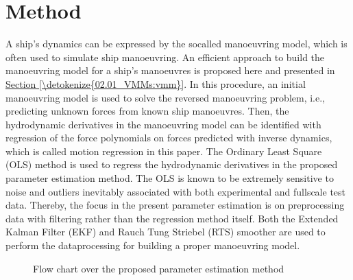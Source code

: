 \documentclass[review]{elsarticle}
\let\sphinxpxdimen\pdfpxdimen\else\newdimen\sphinxpxdimen
\begin{document}
\section{Method}
\label{\detokenize{01.01_method:method}}\label{\detokenize{01.01_method:id1}}\label{\detokenize{01.01_method::doc}}
\sphinxAtStartPar
A ship’s dynamics can be expressed by the so\sphinxhyphen{}called manoeuvring model, which is often used to simulate ship manoeuvring. An efficient approach to build the manoeuvring model for a ship’s manoeuvres is proposed here and presented in \hyperref[\detokenize{02.01_VMMs:vmm}]{Section \ref{\detokenize{02.01_VMMs:vmm}}}. In this procedure, an initial manoeuvring model is used to solve the reversed manoeuvring problem, i.e., predicting unknown forces from known ship manoeuvres. Then, the hydrodynamic derivatives in the manoeuvring model can be identified with regression of the force polynomials on forces predicted with inverse dynamics, which is called motion regression in this paper. The Ordinary Least Square (OLS) method is used to regress the hydrodynamic derivatives in the proposed parameter estimation method. The OLS is known to be extremely sensitive to noise and outliers inevitably associated with both experimental and full\sphinxhyphen{}scale test data. Thereby, the focus in the present parameter estimation is on pre\sphinxhyphen{}processing data with filtering rather than the regression method itself. Both the Extended Kalman Filter (EKF) and Rauch Tung Striebel (RTS) smoother are used to perform the data\sphinxhyphen{}processing for building a proper manoeuvring model.

\begin{figure}[H]
\centering
\capstart

\noindent\sphinxincludegraphics[width=500\sphinxpxdimen]{{method}.png}
\caption{Flow chart over the proposed parameter estimation method}\label{\detokenize{01.01_method:overview}}\end{figure}
\end{document}
